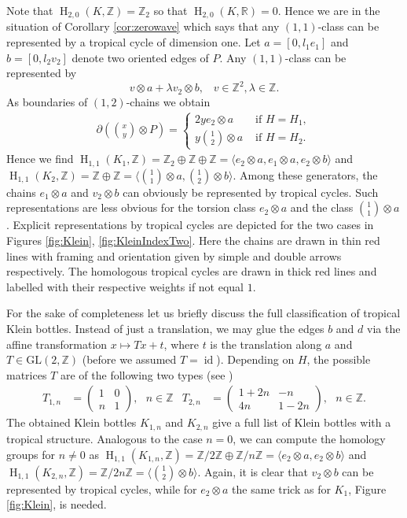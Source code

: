 \documentclass[11pt]{article}
\numberwithin{equation}{numsection}
\newcommand{\Z}{{\mathbb Z}}
\newcommand{\R}{{\mathbb R}}
\DeclareMathOperator{\id}{id}
\DeclareMathOperator{\HH}{H}
\begin{document}
Note that $\HH_{2, 0}(K, \Z) = \Z_2$ so that $\HH_{2, 0}(K, \R) = 0$. Hence we are in the situation of Corollary \ref{cor:zerowave}
which says that any $(1,1)$-class can be represented by a tropical cycle of dimension one. 
Let $a = [0, l_1 e_1]$ and $b = [0, l_2 v_2]$ denote two oriented edges of $P$. Any $(1,1)$-class can be represented by
\[
  v \otimes a + \lambda v_2 \otimes b, \; \; \; v \in \Z^2, \lambda \in \Z.
\]
As boundaries of $(1,2)$-chains we obtain
\begin{align} 
  \partial (\binom{x}{y} \otimes P) = \begin{cases}
	  2y e_2 \otimes a & \text{ if } H=H_1, \\
	  y \binom{1}{2} \otimes a & \text{ if } H=H_2.
	\end{cases}
\end{align}
Hence we find $\HH_{1,1}(K_1, \Z) = \Z_2 \oplus \Z \oplus \Z = \langle e_2 \otimes a, e_1 \otimes a, e_2 \otimes b \rangle$ and 
$\HH_{1,1}(K_2, \Z) = \Z \oplus \Z = \langle \binom{1}{1} \otimes a, \binom{1}{2} \otimes  b \rangle$.
Among these generators, the chains $e_1 \otimes a$ and $v_2 \otimes b$ can obviously be represented 
by tropical cycles. Such representations are less obvious for 
the torsion class $e_2 \otimes a$ and the class $\binom{1}{1} \otimes a$.
Explicit representations by tropical cycles are depicted for the two cases in Figures \ref{fig:Klein}, \ref{fig:KleinIndexTwo}. 
Here the chains are drawn in thin red lines with framing and orientation given by simple and double arrows respectively.
The homologous tropical cycles are drawn in thick red lines and labelled with their respective weights if not equal $1$.

For the sake of completeness let us briefly discuss the full classification of tropical Klein bottles.
Instead of just a translation, we may glue the edges $b$ and $d$ via the affine
transformation $x \mapsto Tx + t$, where $t$ is the translation along $a$ and $T \in \text{GL}(2,\Z)$ (before we assumed $T = \id$). 
Depending on $H$, the possible matrices $T$ are of the following two types (see \cite{Sepe2010}) 
\begin{align} 
  T_{1,n} &= \begin{pmatrix} 1 & 0 \\ n & 1 \end{pmatrix}, \ \ \  n \in \Z & T_{2,n} &= \begin{pmatrix} 1 + 2n & -n \\ 4n & 1-2n \end{pmatrix}, \   \ \ n \in \Z. 
\end{align}
The obtained Klein bottles $K_{1,n}$ and $K_{2,n}$ give a full list of Klein bottles with a tropical structure. Analogous to the case $n=0$, we
can compute the homology groups for $n \neq 0$ as
$\HH_{1,1}(K_{1,n}, \Z) = \Z / 2 \Z \oplus \Z / n \Z = \langle e_2 \otimes a, e_2 \otimes b \rangle$ and 
$\HH_{1,1}(K_{2,n}, \Z) = \Z / 2n \Z = \langle \binom{1}{2} \otimes b \rangle$.
Again, it is clear that $v_2 \otimes b$ can be represented by tropical cycles, while 
for $e_2 \otimes a$ the same trick as for $K_1$, Figure \ref{fig:Klein}, is needed. 
\end{document}
